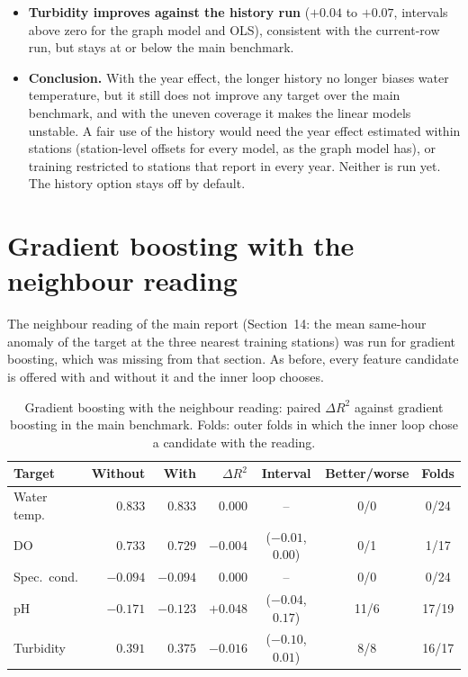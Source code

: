 \documentclass[11pt]{article}
\begin{document}
\begin{itemize}
  \item \textbf{Turbidity improves against the history run} ($+0.04$ to $+0.07$, intervals above
        zero for the graph model and OLS), consistent with the current-row run, but stays at or
        below the main benchmark.
  \item \textbf{Conclusion.} With the year effect, the longer history no longer biases water
        temperature, but it still does not improve any target over the main benchmark, and with
        the uneven coverage it makes the linear models unstable. A fair use of the history would
        need the year effect estimated within stations (station-level offsets for every model, as
        the graph model has), or training restricted to stations that report in every year. Neither
        is run yet. The history option stays off by default.
\end{itemize}

\section{Gradient boosting with the neighbour reading}\label{sec:nbrgb}

The neighbour reading of the main report (Section~14: the mean same-hour anomaly of the target at
the three nearest training stations) was run for gradient boosting, which was missing from that
section. As before, every feature candidate is offered with and without it and the inner loop
chooses.

\begin{table}[h]
\centering
\small
\caption{Gradient boosting with the neighbour reading: paired $\Delta R^2$ against gradient boosting
in the main benchmark. Folds: outer folds in which the inner loop chose a candidate with the reading.}
\label{tab:nbrgb}
\begin{tabular}{l rrrcc c}
\toprule
Target & Without & With & $\Delta R^2$ & Interval & Better/worse & Folds \\
\midrule
Water temp.  & $0.833$ & $0.833$ & $0.000$ & -- & 0/0 & 0/24 \\
DO           & $0.733$ & $0.729$ & $-0.004$ & ($-0.01$, $0.00$) & 0/1 & 1/17 \\
Spec.\ cond. & $-0.094$ & $-0.094$ & $0.000$ & -- & 0/0 & 0/24 \\
pH           & $-0.171$ & $-0.123$ & $+0.048$ & ($-0.04$, $0.17$) & 11/6 & 17/19 \\
Turbidity    & $0.391$ & $0.375$ & $-0.016$ & ($-0.10$, $0.01$) & 8/8 & 16/17 \\
\bottomrule
\end{tabular}
\end{table}
\end{document}

